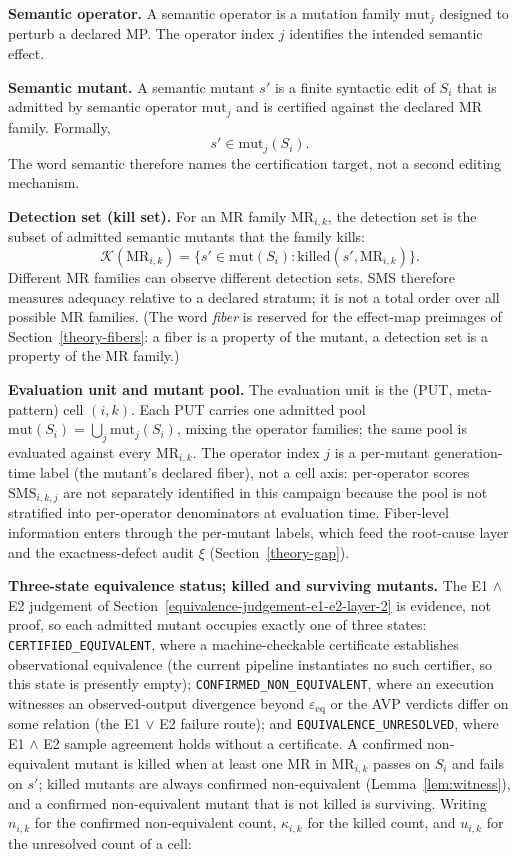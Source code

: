 \documentclass[manuscript,screen,review]{acmart}
\begin{document}
\textbf{Semantic operator.} A semantic operator is a mutation family
\(\mathrm{mut}_j\) designed to perturb a declared MP. The operator index
\(j\) identifies the intended semantic effect.

\textbf{Semantic mutant.} A semantic mutant \(s'\) is a finite syntactic
edit of \(S_i\) that is admitted by semantic operator \(\mathrm{mut}_j\)
and is certified against the declared MR family. Formally,
\[
  s' \in \mathrm{mut}_j(S_i).
\]
The word semantic therefore names the certification target, not a second
editing mechanism.

\textbf{Detection set (kill set).} For an MR family \(\mathrm{MR}_{i,k}\),
the detection set is the subset of admitted semantic mutants
that the family kills:
\[
  \mathcal{K}(\mathrm{MR}_{i,k}) =
  \{s' \in \mathrm{mut}(S_i): \mathrm{killed}(s', \mathrm{MR}_{i,k})\}.
\]
Different MR families can observe different detection sets. SMS therefore
measures adequacy relative to a declared stratum; it is not a total order
over all possible MR families. (The word \emph{fiber} is reserved for
the effect-map preimages of Section~\ref{theory-fibers}: a fiber is a
property of the mutant, a detection set is a property of the MR family.)

\textbf{Evaluation unit and mutant pool.} The evaluation unit is the
(PUT, meta-pattern) cell \((i,k)\). Each PUT carries one admitted pool
\(\mathrm{mut}(S_i) = \bigcup_j \mathrm{mut}_j(S_i)\), mixing the
operator families; the same pool is evaluated against every
\(\mathrm{MR}_{i,k}\). The operator index \(j\) is a per-mutant
generation-time label (the mutant's declared fiber), not a cell axis:
per-operator scores \(\mathrm{SMS}_{i,k,j}\) are not separately
identified in this campaign because the pool is not stratified into
per-operator denominators at evaluation time. Fiber-level information
enters through the per-mutant labels, which feed the root-cause layer
and the exactness-defect audit \(\xi\) (Section~\ref{theory-gap}).

\textbf{Three-state equivalence status; killed and surviving mutants.}
The E1 $\wedge$ E2 judgement of Section~\ref{equivalence-judgement-e1-e2-layer-2} is evidence, not proof, so
each admitted mutant occupies exactly one of three states:
\texttt{CERTIFIED\_EQUIVALENT}, where a machine-checkable certificate
establishes observational equivalence (the current pipeline instantiates
no such certifier, so this state is presently empty);
\texttt{CONFIRMED\_NON\_EQUIVALENT}, where an execution witnesses an
observed-output divergence beyond $\varepsilon_{\mathrm{eq}}$ or the AVP
verdicts differ on some relation (the E1 $\vee$ E2 failure route); and
\texttt{EQUIVALENCE\_UNRESOLVED}, where E1 $\wedge$ E2 sample agreement
holds without a certificate. A confirmed non-equivalent mutant is killed
when at least one MR in \(\mathrm{MR}_{i,k}\) passes on \(S_i\) and
fails on \(s'\); killed mutants are always confirmed non-equivalent
(Lemma~\ref{lem:witness}), and a confirmed non-equivalent mutant that is
not killed is surviving. Writing \(n_{i,k}\) for the confirmed
non-equivalent count, \(\kappa_{i,k}\) for the killed count, and
\(u_{i,k}\) for the unresolved count of a cell:
\end{document}
